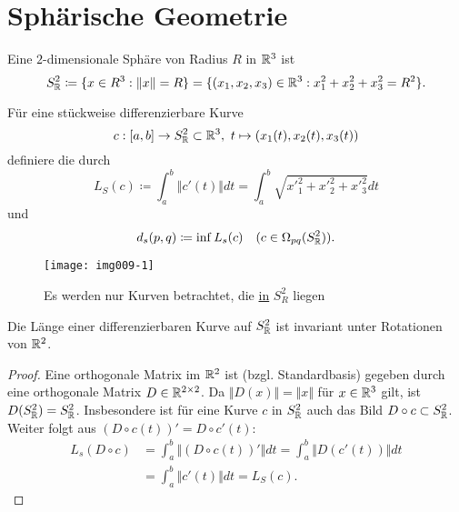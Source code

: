\section{Sphärische Geometrie}
\begin{example}
  Eine $ 2 $-dimensionale Sphäre von Radius $ R $ in $ \mathbb{R}^3 $ ist
  \begin{equation*}
    S^2_{\mathbb{R}} \coloneqq \{ x \in R^3 : \Vert x \Vert = R \} = \{ (x_1, x_2, x_3) \in \mathbb{R}^3 : x_1^2+x_2^2+x_3^2 = R^2 \}\text{.}
  \end{equation*}


  \begin{minipage}{.65\textwidth}
    Für eine stückweise differenzierbare Kurve
    \begin{equation*}
      c: [a,b] \to S^2_{\mathbb{R}} \subset \mathbb{R}^3, \ t \mapsto (x_1(t), x_2(t), x_3(t))
    \end{equation*}
    definiere die  durch
    \begin{equation*}
      L_S(c) \coloneqq \int_a^b \Vert c'(t) \Vert dt = \int_a^b \sqrt{{x'}_1^2+{x'}_2^2+{x'}_3^2}dt
    \end{equation*}
    und
    \begin{equation*}
      d_s(p,q) \coloneqq \inf L_s(c) \quad (c \in \Omega_{pq}(S^2_{\mathbb{R}}))\text{.}
    \end{equation*}
  \end{minipage}
  \hfill
  \begin{minipage}{.25\textwidth}
    \begin{figure}[H]
      \label{img009-1}
      \texttt{[image: img009-1]}
      \caption{Es werden nur Kurven betrachtet, die \underline{in} $ S_R^2 $ liegen}
    \end{figure}
  \end{minipage}
\end{example}

\begin{lemma}
  \label{lemma:kurvenlaengen}
  Die Länge einer differenzierbaren Kurve auf $ S^2_{\mathbb{R}} $ ist invariant unter Rotationen von $ \mathbb{R}^2 $.
  \begin{proof}
    Eine orthogonale Matrix im $ \mathbb{R}^2 $ ist (bzgl. Standardbasis) gegeben durch eine orthogonale Matrix $ D \in \mathbb{R}^{2 \times 2} $. Da $ \Vert D(x) \Vert = \Vert x \Vert $ für $ x \in \mathbb{R}^3 $ gilt, ist $ D(S^2_{\mathbb{R}}) = S^2_{\mathbb{R}} $. Insbesondere ist für eine Kurve $ c $ in $ S^2_{\mathbb{R}} $ auch das Bild $ D \circ c \subset S^2_{\mathbb{R}} $. \\
    Weiter folgt aus $ (D \circ c(t))' = D \circ c'(t) $:
    \begin{align*}
      L_s(D \circ c) &= \int_a^b \Vert (D \circ c(t))' \Vert dt = \int_a^b \Vert D(c'(t)) \Vert dt \\
        &= \int_a^b \Vert c'(t) \Vert dt = L_S(c)\text{.}
    \end{align*}
  \end{proof}
\end{lemma}

